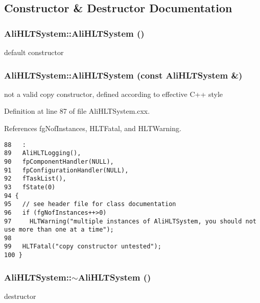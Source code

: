 \subsection{Constructor \& Destructor Documentation}
\subsubsection{\setlength{\rightskip}{0pt plus 5cm}Ali\-HLTSystem::Ali\-HLTSystem ()}\label{classAliHLTSystem_a0}


default constructor 
\subsubsection{\setlength{\rightskip}{0pt plus 5cm}Ali\-HLTSystem::Ali\-HLTSystem (const {\bf Ali\-HLTSystem} \&)}\label{classAliHLTSystem_a1}


not a valid copy constructor, defined according to effective C++ style 

Definition at line 87 of file Ali\-HLTSystem.cxx.

References fg\-Nof\-Instances, HLTFatal, and HLTWarning.

\footnotesize\begin{verbatim}88   :
89   AliHLTLogging(),
90   fpComponentHandler(NULL),
91   fpConfigurationHandler(NULL),
92   fTaskList(),
93   fState(0)
94 {
95   // see header file for class documentation
96   if (fgNofInstances++>0)
97     HLTWarning("multiple instances of AliHLTSystem, you should not use more than one at a time");
98 
99   HLTFatal("copy constructor untested");
100 }

\end{verbatim}\normalsize 


\subsubsection{\setlength{\rightskip}{0pt plus 5cm}Ali\-HLTSystem::$\sim${\bf Ali\-HLTSystem} ()\hspace{0.3cm}{\tt  [virtual]}}\label{classAliHLTSystem_a3}


destructor 

